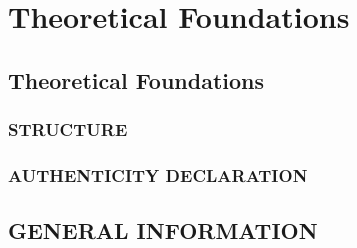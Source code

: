\chapter{Theoretical Foundations}\label{section:theory}
\thispagestyle{pagestyle}


\section{Theoretical Foundations}
\subsection{STRUCTURE} \label{section:structure}

\subsection{AUTHENTICITY DECLARATION}

\section{GENERAL INFORMATION}
